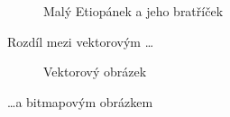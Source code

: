 \documentclass[a4paper, 11pt]{article}
\begin{document}
\begin{figure}[h]
{        
    }
    \caption{Malý Etiopánek a jeho bratříček}
    \label{fig:etiop}
\end{figure}

\newpage
Rozdíl mezi vektorovým \dots

\begin{figure}[h]
    \centering
    \caption{Vektorový obrázek}
    \label{fig:vektor}
\end{figure}
\bigskip
\noindent \dots a bitmapovým obrázkem
\end{document}
